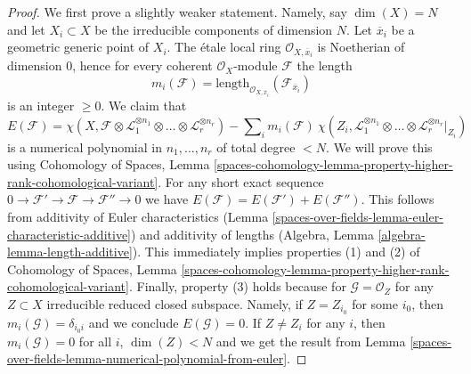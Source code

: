 \begin{proof}
We first prove a slightly weaker statement. Namely, say
$\dim(X) = N$ and let $X_i \subset X$ be the irreducible
components of dimension $N$. Let $\overline{x}_i$ be a geometric
generic point of $X_i$. The \'etale local ring
$\mathcal{O}_{X, \overline{x}_i}$ is Noetherian of
dimension $0$, hence for every coherent $\mathcal{O}_X$-module
$\mathcal{F}$ the length
$$
m_i(\mathcal{F}) = \text{length}_{\mathcal{O}_{X, \overline{x}_i}}
(\mathcal{F}_{\overline{x}_i})
$$
is an integer $\geq 0$. We claim that
$$
E(\mathcal{F}) =
\chi(X, \mathcal{F} \otimes \mathcal{L}_1^{\otimes n_1} \otimes \ldots \otimes
\mathcal{L}_r^{\otimes n_r}) -
\sum\nolimits_i
m_i(\mathcal{F})\ \chi(Z_i, \mathcal{L}_1^{\otimes n_1} \otimes \ldots \otimes
\mathcal{L}_r^{\otimes n_r}|_{Z_i})
$$
is a numerical polynomial in $n_1, \ldots, n_r$ of total degree $< N$.
We will prove this using Cohomology of Spaces, Lemma
\ref{spaces-cohomology-lemma-property-higher-rank-cohomological-variant}.
For any short exact sequence $0 \to \mathcal{F}' \to \mathcal{F} \to
\mathcal{F}'' \to 0$ we have
$E(\mathcal{F}) = E(\mathcal{F}') + E(\mathcal{F}'')$.
This follows from additivity of Euler characteristics
(Lemma \ref{spaces-over-fields-lemma-euler-characteristic-additive})
and additivity of lengths
(Algebra, Lemma \ref{algebra-lemma-length-additive}).
This immediately implies properties (1) and (2) of Cohomology of Spaces, Lemma
\ref{spaces-cohomology-lemma-property-higher-rank-cohomological-variant}.
Finally, property (3) holds because for $\mathcal{G} = \mathcal{O}_Z$
for any $Z \subset X$ irreducible reduced closed subspace.
Namely, if $Z = Z_{i_0}$ for some $i_0$, then
$m_i(\mathcal{G}) = \delta_{i_0i}$ and we conclude $E(\mathcal{G}) = 0$.
If $Z \not = Z_i$ for any $i$, then $m_i(\mathcal{G}) = 0$ for all $i$,
$\dim(Z) < N$ and we get the result from
Lemma \ref{spaces-over-fields-lemma-numerical-polynomial-from-euler}.


\end{proof}
